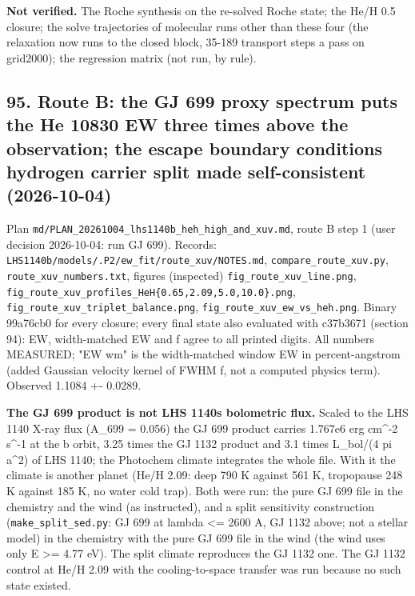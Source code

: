 \documentclass[english,a4paper]{my_memo}
\begin{document}
\textbf{Not verified.} The Roche synthesis on the re-solved Roche state; the
He/H 0.5 closure; the solve trajectories of molecular runs other than these
four (the relaxation now runs to the closed block, 35-189 transport steps a
pass on grid2000); the regression matrix (not run, by rule).

\subsection{95. Route B: the GJ 699 proxy spectrum puts the He 10830 EW three times above the observation; the escape boundary condition\textquotesingle s hydrogen carrier split made self-consistent (2026-10-04)}\label{95-route-b-the-gj-699-proxy-spectrum-puts-the-he-10830-ew-three-times-above-the-observation-the-escape-boundary-conditions-hydrogen-carrier-split-made-self-consistent-2026-10-04}

Plan \texttt{md/PLAN\_20261004\_lhs1140b\_heh\_high\_and\_xuv.md}, route B step 1 (user
decision 2026-10-04: run GJ 699). Records:
\texttt{LHS1140b/models/.P2/ew\_fit/route\_xuv/NOTES.md}, \texttt{compare\_route\_xuv.py},
\texttt{route\_xuv\_numbers.txt}, figures (inspected) \texttt{fig\_route\_xuv\_line.png},
\texttt{fig\_route\_xuv\_profiles\_HeH\{0.65,2.09,5.0,10.0\}.png},
\texttt{fig\_route\_xuv\_triplet\_balance.png}, \texttt{fig\_route\_xuv\_ew\_vs\_heh.png}. Binary
99a76cb0 for every closure; every final state also evaluated with c37b3671
(section 94): EW, width-matched EW and f agree to all printed digits. All
numbers MEASURED; "EW wm" is the width-matched window EW in percent-angstrom
(added Gaussian velocity kernel of FWHM f, not a computed physics term).
Observed 1.1084 +- 0.0289.

\textbf{The GJ 699 product is not LHS 1140\textquotesingle s bolometric flux.} Scaled to the
LHS 1140 X-ray flux (A\_699 = 0.056) the GJ 699 product carries 1.767e6
erg cm\^{}-2 s\^{}-1 at the b orbit, 3.25 times the GJ 1132 product and 3.1 times
L\_bol/(4 pi a\^{}2) of LHS 1140; the Photochem climate integrates the whole
file. With it the climate is another planet (He/H 2.09: deep 790 K against
561 K, tropopause 248 K against 185 K, no water cold trap). Both were run:
the pure GJ 699 file in the chemistry and the wind (as instructed), and a
split sensitivity construction (\texttt{make\_split\_sed.py}: GJ 699 at lambda \textless=
2600 A, GJ 1132 above; not a stellar model) in the chemistry with the pure
GJ 699 file in the wind (the wind uses only E \textgreater= 4.77 eV). The split
climate reproduces the GJ 1132 one. The GJ 1132 control at He/H 2.09 with
the cooling-to-space transfer was run because no such state existed.
\end{document}
